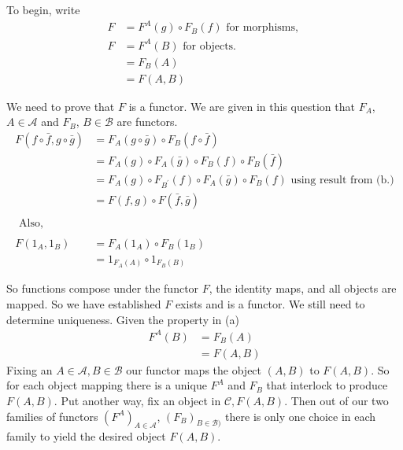 \documentclass{article}
\begin{document}
To begin, write
\begin{align*}
  F &= F^A(g) \circ F_B(f) \text{ for morphisms, } \\
  F & =F^A(B) \text{ for objects. } \\
    & =F_B(A) \\
    & = F(A,B)
\end{align*}

We need to prove that $F$ is a functor. We are given in this question that $F_A$, $A \in \mathcal{A}$ and $F_B$, $B \in \mathcal{B}$ are functors.
\begin{align*}
  F(f \circ \bar{f}, g \circ \bar{g}) &= F_A(g \circ \bar{g}) \circ F_B(f \circ \bar{f}) \\
                                                &= F_A(g) \circ F_A(\bar{g}) \circ F_B(f) \circ F_B(\bar{f}) \\
                                                &= F_A(g) \circ F_{B^{\prime}}(f) \circ F_A(\bar{g}) \circ F_B(f) \text{ using result from (b.)} \\
                                      &= F(f,g) \circ F(\bar{f}, \bar{g}) \\ \\
  \text { Also, } \\\\
  F(1_A,1_B) &= F_A(1_A) \circ F_B(1_B) \\
             &= 1_{F_A(A)} \circ 1_{F_B(B)}
\end{align*}

So functions compose under the functor $F$, the identity maps, and all objects are mapped. So we have established $F$ exists and is a functor. We still need to determine uniqueness. Given the property in (a)
\begin{align*}
  F^A(B) &= F_B(A) \\
         &= F(A,B)
\end{align*}
Fixing an $A \in \mathcal{A}, B \in \mathcal{B}$ our functor maps the object $(A,B)$ to $F(A,B)$. So for each object mapping there is a unique $F^A$ and $F_B$ that interlock to produce $F(A,B)$. Put another way, fix an object in $\mathcal{C}, F(A,B)$. Then out of our two families of functors $(F^A)_{A\in\mathcal{A}}$, $(F_B)_{B\in\mathcal{B})}$ there is only one choice in each family to yield the desired object $F(A,B)$.
\end{document}
